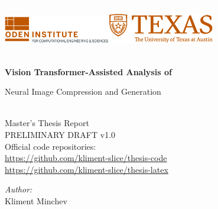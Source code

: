 \begin{titlepage}


\TITLEBOX

\begin{center}



\sffamily\textsc{\huge{\textcolor{white}{The University of Texas at Austin}}}\\[4cm]


\includegraphics[width=0.35\textwidth]{media/faculty.png}\makebox[1.5cm]{}\includegraphics[width=0.35\textwidth]{media/unilogo.png}~\\[1.5cm]



\HRule \\[0.4cm]
{
 \huge \bfseries \sffamily Vision Transformer-Assisted Analysis of
 
Neural Image Compression and Generation  \\[0.4cm] 
}

\HRule \\[0.4cm] 

\normalfont \LARGE \sffamily Master's Thesis Report \\[1.5cm]
\normalfont \large \sffamily PRELIMINARY DRAFT v1.0 \\[0.5cm]
\normalfont \large \sffamily Official code repositories: \\
\normalfont \large \sffamily \url{https://github.com/kliment-slice/thesis-code} \\[0.05cm]
\normalfont \large \sffamily \url{https://github.com/kliment-slice/thesis-latex} \\[1.0cm]

\noindent
\begin{minipage}{0.4\textwidth}
\begin{center} \large
\emph{Author:}\\
Kliment Minchev\\
\end{center}
\end{minipage}


\end{center}
\end{titlepage}
